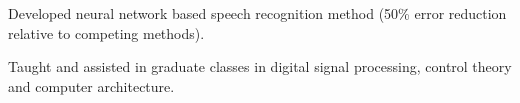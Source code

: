   
\vspace{-.8cm}
\begin{items}
\item Developed neural
network based speech recognition method (50\% error reduction
relative to competing methods).
\end{items}

  
\vspace{-.8cm}
\begin{items}
\item Taught and assisted in graduate classes in digital signal processing, control theory and computer architecture. 
\end{items}